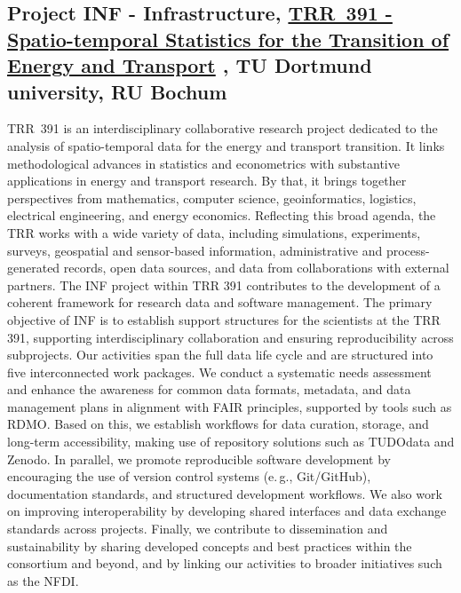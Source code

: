 \documentclass{eceasst}
\newcommand{\eg}{e.\,g.}
\begin{document}
\subsection{Project INF - Infrastructure, \href{https://trr391.tu-dortmund.de/}{TRR~391 - Spatio-temporal Statistics for the Transition of Energy and Transport}
, TU Dortmund university, RU Bochum}
TRR~391 is an interdisciplinary collaborative research project dedicated to the analysis of
spatio-temporal data for the energy and transport transition. It links methodological
advances in statistics and econometrics with substantive applications in energy and transport
research. By that, it brings together perspectives from mathematics, computer science,
geoinformatics, logistics, electrical engineering, and energy economics. Reflecting this broad
agenda, the TRR works with a wide variety of data, including simulations, experiments,
surveys, geospatial and sensor-based information, administrative and process-generated
records, open data sources, and data from collaborations with external partners.
The INF project within TRR 391 contributes to the development of a coherent framework for
research data and software management. The primary objective of INF is to establish support
structures for the scientists at the TRR 391, supporting interdisciplinary collaboration and
ensuring reproducibility across subprojects.
Our activities span the full data life cycle and are structured into five interconnected work
packages.
We conduct a systematic needs assessment and enhance the awareness for common data
formats, metadata, and data management plans in alignment with FAIR principles, supported
by tools such as RDMO. Based on this, we establish workflows for data curation, storage, and
long-term accessibility, making use of repository solutions such as TUDOdata and Zenodo.
In parallel, we promote reproducible software development by encouraging the use of
version control systems (\eg, Git/GitHub), documentation standards, and structured
development workflows. We also work on improving interoperability by developing shared
interfaces and data exchange standards across projects.
Finally, we contribute to dissemination and sustainability by sharing developed concepts and
best practices within the consortium and beyond, and by linking our activities to broader
initiatives such as the NFDI.
\end{document}
